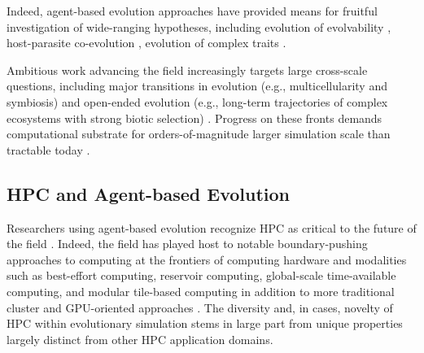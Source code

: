 Indeed, agent-based evolution approaches have provided means for fruitful investigation of wide-ranging hypotheses, including evolution of evolvability \citep{wilke2001evolution}, host-parasite co-evolution \citep{zaman2014coevolution}, evolution of complex traits \citep{lenski2003evolutionary}.

Ambitious work advancing the field increasingly targets large cross-scale questions, including major transitions in evolution (e.g., multicellularity and symbiosis) \citep{goldsby2020major,vostinar2021symbiosis} and open-ended evolution (e.g., long-term trajectories of complex ecosystems with strong biotic selection) \citep{stanley2019open,taylor2016open}.
Progress on these fronts demands computational substrate for orders-of-magnitude larger simulation scale than tractable today \citep{moreno2022exploring,channon2019maximum}.


\subsection{HPC and Agent-based Evolution}


Researchers using agent-based evolution recognize HPC as critical to the future of the field \citep{ackley2016indefinite}.
Indeed, the field has played host to notable boundary-pushing approaches to computing at the frontiers of computing hardware and modalities such as best-effort computing, reservoir computing, global-scale time-available computing, and modular tile-based computing in addition to more traditional cluster and GPU-oriented approaches \citep{moreno2021conduit,ackley2020best,ackley2023robust,heinemann2008artificial,miikkulainen2024evolving}.
The diversity and, in cases, novelty of HPC within evolutionary simulation stems in large part from unique properties largely distinct from other HPC application domains.

